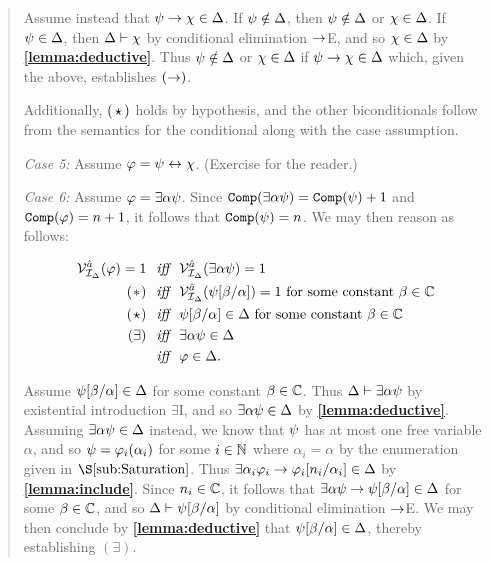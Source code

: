 \begin{quote}
  Assume instead that $\psi\rightarrow\chi\in\Delta$.
  If $\psi\notin\Delta$, then $\psi\notin\Delta$ or $\chi\in\Delta$.
  If $\psi\in\Delta$, then $\Delta\vdash\chi$ by conditional elimination $\rightarrow$E, and so $\chi\in\Delta$ by \textbf{\ref{lemma:deductive}}.
  Thus $\psi\notin\Delta$ or $\chi\in\Delta$ if $\psi\rightarrow\chi\in\Delta$ which, given the above, establishes $(\rightarrow)$.  

  Additionally, $(\hspace{1.6pt}\star\hspace{1.6pt})$ holds by hypothesis, and the other biconditionals follow from the semantics for the conditional along with the case assumption.

  \textit{Case 5:}
  Assume $\varphi=\psi\leftrightarrow\chi$. (Exercise for the reader.)

  \textit{Case 6:}
  Assume $\varphi=\exists \alpha\psi$.
  Since $\texttt{Comp}(\exists \alpha\psi)=\texttt{Comp}(\psi)+1$ and $\texttt{Comp}(\varphi)=n+1$, it follows that $\texttt{Comp}(\psi)=n$.
  We may then reason as follows:

  \vspace{-.2in}
  \begin{align*}
    \mathcal{V}_{\mathcal{I}_\Delta}^{\hat{a}}(\varphi)=1 &\textit{ ~iff~ } \mathcal{V}_{\mathcal{I}_\Delta}^{\hat{a}}(\exists \alpha\psi)=1\\
      (\hspace{.7pt}\ast\hspace{.7pt}) &\textit{ ~iff~ } \mathcal{V}_{\mathcal{I}_\Delta}^{\hat{a}}(\psi[\beta/\alpha])=1 \text{ for some constant } \beta\in\mathbb{C}\\
      (\hspace{.7pt}\star\hspace{.7pt}) &\textit{ ~iff~ } \psi[\beta/\alpha]\in\Delta \text{ for some constant } \beta\in\mathbb{C}\\ 
      (\exists) &\textit{ ~iff~ } \exists \alpha\psi\in\Delta \\
      &\textit{ ~iff~ } \varphi\in\Delta.
  \end{align*}

  Assume $\psi[\beta/\alpha]\in\Delta$ for some constant $\beta\in\mathbb{C}$.
  Thus $\Delta\vdash \exists \alpha\psi$ by existential introduction $\exists$I, and so $\exists \alpha\psi\in\Delta$ by \textbf{\ref{lemma:deductive}}.
  Assuming $\exists \alpha\psi\in\Delta$ instead, we know that $\psi$ has at most one free variable $\alpha$, and so $\psi=\varphi_i(\alpha_i)$ for some $i\in\mathbb{N}$ where $\alpha_i=\alpha$ by the enumeration given in $\S\ref{sub:Saturation}$.
  Thus $\exists \alpha_i\varphi_i\rightarrow \varphi_i[n_i/\alpha_i]\in\Delta$ by \textbf{\ref{lemma:include}}.
  Since $n_i\in\mathbb{C}$, it follows that $\exists \alpha\psi\rightarrow\psi[\beta/\alpha]\in\Delta$ for some $\beta\in\mathbb{C}$, and so $\Delta\vdash\psi[\beta/\alpha]$ by conditional elimination $\rightarrow$E. 
  We may then conclude by \textbf{\ref{lemma:deductive}} that $\psi[\beta/\alpha]\in\Delta$, thereby establishing $(\exists)$.


\end{quote}
